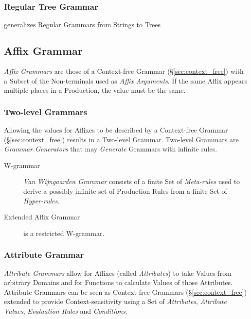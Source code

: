 \subsubsection{Regular Tree Grammar}\label{sec:regular_tree_grammar}

generalizes Regular Grammars from Strings to Trees



\subsection{Affix Grammar}\label{sec:affix_grammar}

\emph{Affix Grammars} are those of a Context-free Grammar
(\S\ref{sec:context_free}) with a Subset of the Non-terminals used as
\emph{Affix Arguments}. If the same Affix appears multiple places in a
Production, the value must be the same.



\subsubsection{Two-level Grammars}\label{sec:two_level_grammar}

Allowing the values for Affixes to be described by a Context-free
Grammar (\S\ref{sec:context_free}) results in a Two-level Grammar.
Two-level Grammars are \emph{Grammar Generators} that may
\emph{Generate} Grammars with infinite rules.



\begin{description}
\item[W-grammar] \emph{Van Wijngaarden Grammar} consists of a finite
  Set of \emph{Meta-rules} used to derive a possibly infinite set of
  Production Rules from a finite Set of \emph{Hyper-rules}.
\item[Extended Affix Grammar] is a restricted W-grammar.
\end{description}



\subsubsection{Attribute Grammar}\label{sec:attribute_grammar}
\cite{slonneger-kurtz95}

\emph{Attribute Grammars} allow for Affixes (called \emph{Attributes})
to take Values from arbitrary Domains and for Functions to calculate
Values of those Attributes. Attribute Grammars can be seen as
Context-free Grammars (\S\ref{sec:context_free}) extended to provide
Context-sensitivity using a Set of \emph{Attributes}, \emph{Attribute
  Values}, \emph{Evaluation Rules} and \emph{Conditions}.

